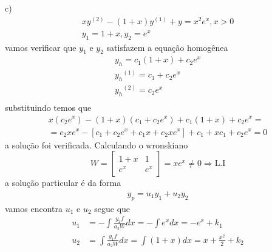 \documentclass[a4paper,12pt]{article}
\begin{document}
c)
\begin{align*}
	xy^{(2)} - (1 + x)y^{(1)} + y = x^{2}e^{x}, x > 0 \\
	y_1 = 1 + x, y_2 = e^{x}
\end{align*}
vamos verificar que $y_1$ e $y_2$ satisfazem a equa\c c\~ao homog\^enea
\begin{align*}
	y_h = c_1 (1 + x) + c_2 e^{x} \\
	{y_h}^{(1)} = c_1 + c_2e^{x} \\
	{y_h}^{(2)} = c_2e^{x} \\
\end{align*}
substituindo temos que 
\begin{align*}
	x(c_2 e^{x}) - (1+x)(c_1 + c_2 e^{x}) + c_1 (1 + x) + c_2 e^{x} =\\
	= c_2 x e^{x} -\left [ c_1 + c_2 e^{x} + c_1 x + c_2 xe^{x}\right ] + c_1 + xc_1 + c_2 e^{x}  = 0
\end{align*}
a solu\c c\~ao foi verificada. Calculando o wronskiano 
\[ W = \left [
	\begin{array}{cc}
		1 + x & 1 \\
		e^{x} & e^{x}
	\end{array}
\right ]  = xe^{x} \neq 0 \Rightarrow \mbox{L.I}
\]
a solu\c c\~ao particular \'e da forma 
\begin{align*}
	y_p = u_1 y_1 + u_2 y_2
\end{align*}
vamos encontra $u_1$ e $u_2$ segue que 
\begin{align*}
	u_1 &= -\int \frac{y_2 f}{a_2 W} dx = -\int e^{x} dx = -e^{x} + k_1 \\
	u_2 &=  \int \frac{y_1 f}{a_2 W} dx  = \int (1 + x) dx = x + \frac{x^{2}}{2} + k_2
\end{align*}
\end{document}
